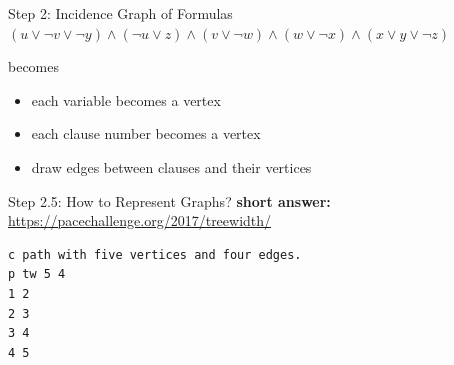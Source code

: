 \documentclass[aspectratio=169]{beamer}
\begin{document}
\begin{frame}{Step 2: Incidence Graph of Formulas}
$(u\lor\lnot v\lor\lnot y)\land(\lnot u\lor z)\land(v\lor\lnot w)\land(w\lor\lnot x)\land(x\lor y\lor\lnot z)$

becomes

\begin{minipage}{.4\linewidth}
\end{minipage}
\begin{minipage}{.55\linewidth}
	\begin{itemize}
		\item each variable becomes a vertex
		\item each clause number becomes a vertex
		\item draw edges between clauses and their vertices
	\end{itemize}
\end{minipage}
\end{frame}

\begin{frame}[fragile]{Step 2.5: How to Represent Graphs?}
\textbf{short answer:} \url{https://pacechallenge.org/2017/treewidth/}

\begin{center}
	\begin{verbatim}
c path with five vertices and four edges.
p tw 5 4
1 2
2 3
3 4
4 5
	\end{verbatim}
\end{center}
\end{frame}
\end{document}
